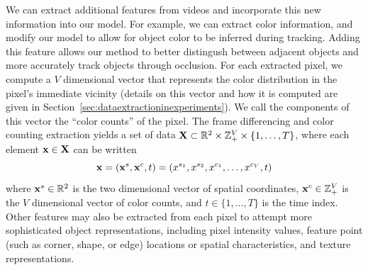 \documentclass[twocolumn, final]{svjour3}
\begin{document}
We can extract additional features from videos and incorporate this new information into our model. For example, we can extract color information, and modify our model to allow for object color to be inferred during tracking. Adding this feature allows our method to better distingush between adjacent objects and more accurately track objects through occlusion. For each extracted pixel, we compute a $V$ dimensional vector that represents the color distribution in the pixel's immediate vicinity (details on this vector and how it is computed are given in Section~\ref{sec:dataextractioninexperiments}). We call the components of this vector the ``color counts'' of the pixel. The frame differencing and color counting extraction yields a set of data $\bold{X} \subset \mathbb{R}^{2} \times \mathbb{Z}_{+}^{V} \times \{1, \ldots, T \}$, where each element $\bold{x} \in \bold{X}$ can be written
\begin{equation}
\bold{x} = ( \bold{x}^{s}, \bold{x}^{c}, t ) = ( x^{s_{1}}, x^{s_{2}}, x^{c_{1}}, \ldots, x^{c_{V}}, t )
\end{equation}
where $\bold{x}^{s} \in \mathbb{R}^{2}$ is the two dimensional vector of spatial coordinates,  $\bold{x}^{c} \in \mathbb{Z}_{+}^{V}$ is the $V$ dimensional vector of color counts, and $t \in \{1, \ldots, T \}$ is the time index. 
Other features may also be extracted from each pixel to attempt more sophisticated object representations, including pixel intensity values, feature point (such as corner, shape, or edge) locations or spatial characteristics, and texture representations.

\end{document}
